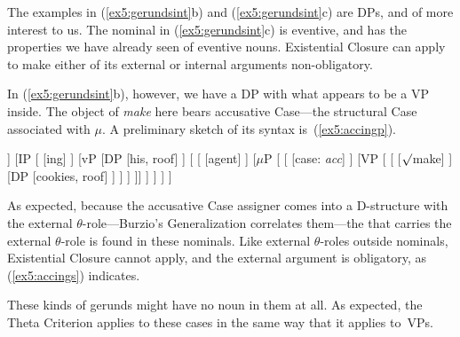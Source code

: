 The examples in (\ref{ex5:gerundsint}b) and (\ref{ex5:gerundsint}c) are DPs, and of more interest to us. The nominal in (\ref{ex5:gerundsint}c) is eventive, and has the properties we have already seen of eventive nouns.%
%
%
%
Existential Closure can apply to make either of its external or internal arguments non-obligatory.
\begin{exe}
	\raggedright
	\ex \label{ex5:cookies2} 
	\begin{xlist}
	\end{xlist}
\end{exe}
In (\ref{ex5:gerundsint}b), however, we have a DP with what appears to be a VP inside. The object of \emph{make} here bears accusative Case---the structural Case associated with $\mu$. A preliminary sketch of its syntax is~(\ref{ex5:accingp}).
\begin{exe}
	\raggedright
	\ex \label{ex5:accingp} 
	\small
	\begin{forest}
	[\ibar{D}
		[\obar{D} [case: \emph{gen}]]
		[IP 
			[ [ing] ]
			[vP 
				[DP [his, roof] ]
				[ 
					[ [agent] ]
					[$\mu$P [\ibar{$\mu$}
						[\obar{$\mu$} [case: \emph{acc}] ]
						[VP [
							[ [$\surd$make] ]
							[DP [cookies, roof] ]
						] ]
					]]
				]
			 ]
		]
	]
	\end{forest}
\end{exe}
As expected, because the accusative Case assigner comes into a D-structure with the external $\theta$-role---Burzio's Generalization correlates them---the  that carries the external $\theta$-role is found in these nominals. Like external $\theta$-roles outside nominals, Existential Closure cannot apply, and the external argument is obligatory, as (\ref{ex5:accings}) indicates.
\begin{exe}
	\raggedright
\end{exe}
These kinds of gerunds might have no noun in them at all. As expected, the Theta Criterion applies to these cases in the same way that it applies to~VPs.

